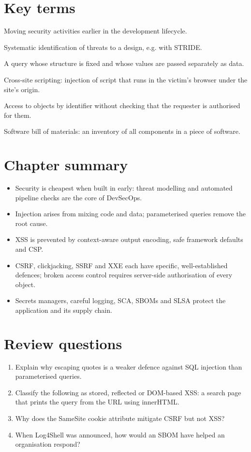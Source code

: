 \documentclass[11pt,openany]{book}
\begin{document}
\section*{Key terms}
\begin{description}[style=nextline,leftmargin=1.2em]
  \item[Shift-left] Moving security activities earlier in the development lifecycle.
  \item[Threat modelling] Systematic identification of threats to a design, e.g. with STRIDE.
  \item[Parameterised query] A query whose structure is fixed and whose values are passed separately as data.
  \item[XSS] Cross-site scripting: injection of script that runs in the victim's browser under the site's origin.
  \item[IDOR / BOLA] Access to objects by identifier without checking that the requester is authorised for them.
  \item[SBOM] Software bill of materials: an inventory of all components in a piece of software.
\end{description}

\section*{Chapter summary}
\begin{itemize}
  \item Security is cheapest when built in early: threat modelling and automated pipeline checks are the core of DevSecOps.
  \item Injection arises from mixing code and data; parameterised queries remove the root cause.
  \item XSS is prevented by context-aware output encoding, safe framework defaults and CSP.
  \item CSRF, clickjacking, SSRF and XXE each have specific, well-established defences; broken access control requires server-side authorisation of every object.
  \item Secrets managers, careful logging, SCA, SBOMs and SLSA protect the application and its supply chain.
\end{itemize}

\section*{Review questions}
\begin{enumerate}
  \item Explain why escaping quotes is a weaker defence against SQL injection than parameterised queries.
  \item Classify the following as stored, reflected or DOM-based XSS: a search page that prints the query from the URL using innerHTML.
  \item Why does the SameSite cookie attribute mitigate CSRF but not XSS?
  \item When Log4Shell was announced, how would an SBOM have helped an organisation respond?
\end{enumerate}
\end{document}
